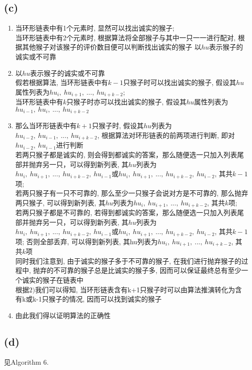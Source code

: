 \documentclass{article}
\begin{document}
\subsection{(c)}
\begin{enumerate}[1)]
\item 
当环形链表中有1个元素时, 显然可以找出诚实的猴子;\\
当环形链表中有2个元素时, 根据算法将全部猴子与其中一只一一进行配对, 根据其他猴子对该猴子的评价数目便可以判断找出诚实的猴子
以$hu$表示猴子的诚实或不可靠
\item 
以$hu$表示猴子的诚实或不可靠 \\
假若根据算法, 当环形链表中有$k-1$只猴子时可以找出诚实的猴子, 假设其$hu$属性列表为$hu_i,\ hu_{i+1},\ ...,\ hu_{i+k-2}$; \\
当环形链表中有$k$只猴子时亦可以找出诚实的猴子, 假设其$hu$属性列表为$hu_{i-1},\ hu_{i},\ ...,\ hu_{i+k-2}$
\item
那么当环形链表中有$k+1$只猴子时, 假设其$hu$列表为$hu_{i-2},\ hu_{i-1},\ ...,\ hu_{i+k-2}$, 根据算法对环形链表的前两项进行判断, 即对$hu_{i-2},\ hu_{i-1}$进行判断\\
若两只猴子都是诚实的, 则会得到都诚实的答案，那么随便选一只加入列表尾部并抛弃另一只，可以得到新列表, 其$hu$列表为$hu_{i},\ hu_{i+1},\ ...,\ hu_{i+k-2},\ hu_{i-1}$或$hu_{i},\ hu_{i+1},\ ...,\ hu_{i+k-2},\ hu_{i-2}$, 其共$k-1$项; \\
若两只猴子有一只不可靠的, 那么至少一只猴子会说对方是不可靠的, 那么抛弃两只猴子, 可以得到新列表, 其$hu$列表为$hu_{i},\ hu_{i+1},\ ...,\ hu_{i+k-2}$, 其共$k$项; \\
若两只猴子都是不可靠的, 若得到都诚实的答案，那么随便选一只加入列表尾部并抛弃另一只，可以得到新列表, 其$hu$列表为$hu_{i},\ hu_{i+1},\ ...,\ hu_{i+k-2},\ hu_{i-1}$或$hu_{i},\ hu_{i+1},\ ...,\ hu_{i+k-2},\ hu_{i-2}$, 其共$k-1$项; 否则全部丢弃, 可以得到新列表, 其hu列表为$hu_{i},\ hu_{i+1},\ ...,\ hu_{i+k-2}$, 其共$k$项\\
同时我们注意到, 由于诚实的猴子多于不可靠的猴子, 在我们进行抛弃猴子的过程中, 抛弃的不可靠的猴子总是比诚实的猴子多, 因而可以保证最终总有至少一个诚实的猴子在链表中\\
根据$2)$我们可以得知, 当环形链表含有k+1只猴子时可以由算法推演转化为含有k或k-1只猴子的情况, 因而可以找到诚实的猴子
\item
由此我们得以证明算法的正确性
\end{enumerate}

\subsection{(d)}
见Algorithm 6.
\end{document}
